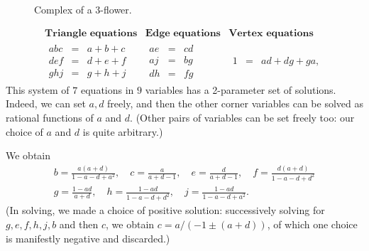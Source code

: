 \documentclass[12pt]{amsart}
\numberwithin{equation}{section}
\theoremstyle{named}
\begin{document}
\begin{figure}[!h]
 \centering
 \caption{Complex of a 3-flower.}
 \label{Fig:CirclePackEqsExample}
\end{figure}

\[
\begin{array}{c|c|c}
\textbf{Triangle equations} & \textbf{Edge equations} & \textbf{Vertex equations} \\
\hline
\begin{array}{rcl}
abc &=& a+b+c \\
def &=& d+e+f \\
ghj &=& g+h+j
\end{array}
&
\begin{array}{rcl}
ae &=& cd \\
aj &=& bg \\
dh &=& fg 
\end{array}
&
\begin{array}{rcl}
1 &=& ad+dg+ga,
\end{array}
\end{array}
\]
This system of $7$ equations in $9$ variables has a 2-parameter set of solutions. Indeed, we can set $a,d$ freely, and then the other corner variables can be solved as rational functions of $a$ and $d$. (Other pairs of variables can be set freely too: our choice of $a$ and $d$ is quite arbitrary.) 

We obtain
\begin{gather*}
b = \frac{a(a+d)}{1-a-d+a^2}, \quad
c = \frac{a}{a+d-1}, \quad
e = \frac{d}{a+d-1}, \quad
f = \frac{d(a+d)}{1-a-d+d^2} \\
g = \frac{1-ad}{a+d}, \quad
h = \frac{1-ad}{1-a-d+d^2}, \quad
j = \frac{1-ad}{1-a-d+a^2}.
\end{gather*}
(In solving, we made a choice of positive solution: successively solving for $g,e,f,h,j,b$ and then $c$, we obtain $c = a/(-1 \pm (a+d))$, of which one choice is manifestly negative and discarded.)
\end{document}
